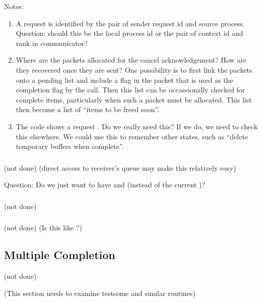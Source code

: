 Notes:
\begin{enumerate}
\item A request is identified by the pair of sender request id and
source process.  Question: should this be the local process id or the
pair of context id and rank in communicator?

\item Where are the packets allocated for the cancel acknowledgement?
How are they recovered once 
they are sent? One possibility is to first link the packets onto a
pending list and include a flag in the packet that is used as the
completion flag by the  call.  Then this list can
be occassionally checked for complete items, particularly when such a
packet must be allocated.  This list then become a list of ``items to
be freed soon''.

\item The code shows a request .  Do we really need this?
If we do, we need to check this elsewhere.  We could use this to
remember other states, such as ``delete temporary buffers when
complete''.

\end{enumerate}

\ifcodefirst
\else
{}
\fi

\subsubsection{\shmemname}
(not done)
(direct access to receiver's queue may make this relatively easy)

Question: Do we just want to have 
and  (instead of the current
)? 

\subsubsection{\shmemallname}
(not done)

\subsubsection{\vianame}
(not done)
(Is this like \tcpname?)

\subsection{Multiple Completion}
(not done)

(This section needs to examine testsome and similar routines)

